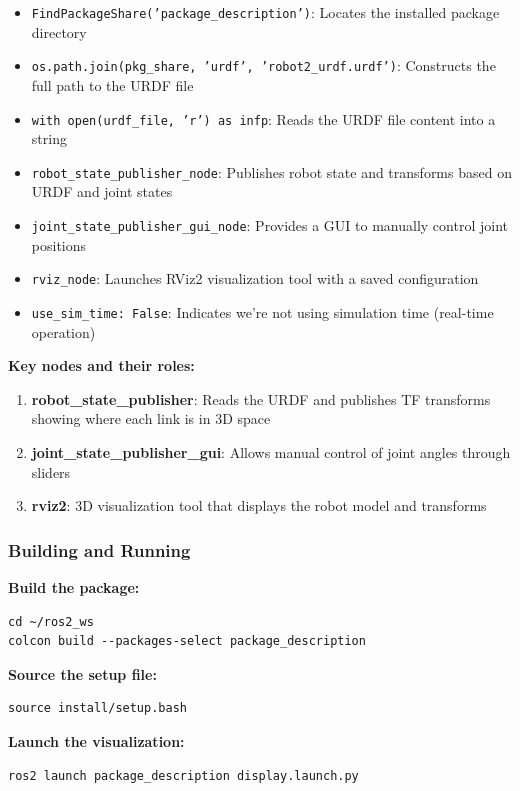 \begin{itemize}
	\item \texttt{FindPackageShare('package\_description')}: Locates the installed package directory
	\item \texttt{os.path.join(pkg\_share, 'urdf', 'robot2\_urdf.urdf')}: Constructs the full path to the URDF file
	\item \texttt{with open(urdf\_file, 'r') as infp}: Reads the URDF file content into a string
	\item \texttt{robot\_state\_publisher\_node}: Publishes robot state and transforms based on URDF and joint states
	\item \texttt{joint\_state\_publisher\_gui\_node}: Provides a GUI to manually control joint positions
	\item \texttt{rviz\_node}: Launches RViz2 visualization tool with a saved configuration
	\item \texttt{use\_sim\_time: False}: Indicates we're not using simulation time (real-time operation)
\end{itemize}

\textbf{Key nodes and their roles:}

\begin{enumerate}
	\item \textbf{robot\_state\_publisher}: Reads the URDF and publishes TF transforms showing where each link is in 3D space
	\item \textbf{joint\_state\_publisher\_gui}: Allows manual control of joint angles through sliders
	\item \textbf{rviz2}: 3D visualization tool that displays the robot model and transforms
\end{enumerate}

\subsubsection{Building and Running}

\textbf{Build the package:}
\begin{verbatim}
cd ~/ros2_ws
colcon build --packages-select package_description
\end{verbatim}

\textbf{Source the setup file:}
\begin{verbatim}
source install/setup.bash
\end{verbatim}

\textbf{Launch the visualization:}
\begin{verbatim}
ros2 launch package_description display.launch.py
\end{verbatim}

